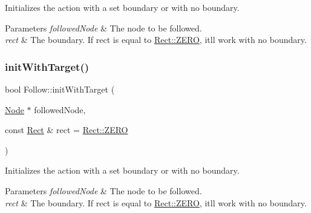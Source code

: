 Initializes the action with a set boundary or with no boundary.


\begin{DoxyParams}{Parameters}
{\em followed\+Node} & The node to be followed. \\
\hline
{\em rect} & The boundary. If {\ttfamily rect} is equal to \hyperlink{classRect_a590be46e60027b2ca0f62a457f91a83e}{Rect\+::\+Z\+E\+RO}, it\textquotesingle{}ll work with no boundary. \\
\hline
\end{DoxyParams}
\mbox{\label{classFollow_a71644134a18ece1b4367910d952872f6}} 
\subsubsection{\texorpdfstring{init\+With\+Target()}{initWithTarget()}\hspace{0.1cm}{\footnotesize\ttfamily [2/2]}}
{\footnotesize\ttfamily bool Follow\+::init\+With\+Target (\begin{DoxyParamCaption}\item[{\hyperlink{classNode}{Node} $\ast$}]{followed\+Node,  }\item[{const \hyperlink{classRect}{Rect} \&}]{rect = {\ttfamily \hyperlink{classRect_a590be46e60027b2ca0f62a457f91a83e}{Rect\+::\+Z\+E\+RO}} }\end{DoxyParamCaption})}

Initializes the action with a set boundary or with no boundary.


\begin{DoxyParams}{Parameters}
{\em followed\+Node} & The node to be followed. \\
\hline
{\em rect} & The boundary. If {\ttfamily rect} is equal to \hyperlink{classRect_a590be46e60027b2ca0f62a457f91a83e}{Rect\+::\+Z\+E\+RO}, it\textquotesingle{}ll work with no boundary. \\
\hline
\end{DoxyParams}
\mbox{\label{classFollow_ad9a776217489f9a9d545df6f7cf6e7bb}} 

